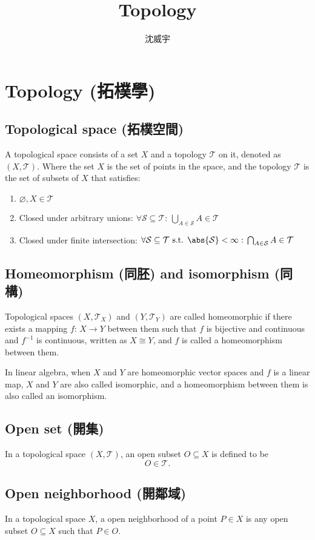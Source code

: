 \documentclass[a4paper,12pt]{article}
\begin{document}
\title{Topology}
\author{沈威宇}
\date{\temtoday}
\titletocdoc
\section{Topology (拓樸學)}
\subsection{Topological space (拓樸空間)}
A topological space consists of a set $X$ and a topology $\mathcal{T}$ on it, denoted as \( (X, \mathcal{T}) \). Where the set \( X \) is the set of points in the space, and the topology \( \mathcal{T} \) is the set of subsets of \( X \) that satisfies:
\begin{enumerate}
\item \(\varnothing,X\in\mathcal{T} \)
\item Closed under arbitrary unions: \(\forall\mathcal{S}\subseteq\mathcal{T}:\,\bigcup_{A\in\mathcal{S}}A\in\mathcal{T}\)
\item Closed under finite intersection: \(\forall\mathcal{S}\subseteq\mathcal{T}\text{ s.t. }\abs{\mathcal{S}}<\infty:\,\bigcap_{A\in\mathcal{S}}A\in\mathcal{T}\)
\end{enumerate}
\subsection{Homeomorphism (同胚) and isomorphism (同構)}
Topological spaces $(X,\mathcal{T}_X)$ and $(Y,\mathcal{T}_Y)$ are called homeomorphic if there exists a mapping $f:\,X\rightarrow Y$ between them such that $f$ is bijective and continuous and $f^{-1}$ is continuous, written as \( X \cong Y \), and $f$ is called a homeomorphism between them.

In linear algebra, when $X$ and $Y$ are homeomorphic vector spaces and $f$ is a linear map, $X$ and $Y$ are also called isomorphic, and a homeomorphism between them is also called an isomorphism.
\subsection{Open set (開集)}
In a topological space \( (X, \mathcal{T}) \), an open subset \( O \subseteq X \) is defined to be
\[O\in \mathcal{T}.\]
\subsection{Open neighborhood (開鄰域)}
In a topological space $X$, a open neighborhood of a point $P\in X$ is any open subset $O\subseteq X$ such that $P\in O$.
\end{document}
